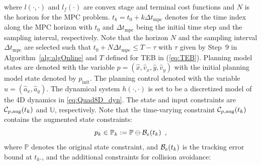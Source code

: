 %
where $l(\cdot,\cdot)$ and $l_f(\cdot)$ are convex stage and terminal cost functions and $N$ is the horizon for the MPC problem. 
$t_k = t_0 + k \Delta t_{\text{mpc}}$ denotes for the time index along the MPC horizon with $t_0$ and $\Delta t_{\text{mpc}}$ being the initial time step and the sampling interval, respectively. 
Note that the horizon $N$ and the sampling interval $\Delta t_{\text{mpc}}$ are selected such that $t_0 + N \Delta t_{\text{mpc}}\leq T - \tau$ with $\tau$ given by Step~9 in Algorithm~\ref{alg:algOnline} and $T$ defined for TEB in (\ref{eq:TEB}). 
Planning model states are denoted with the variable $p = (\hat x, \hat v_x, \hat y, \hat v_y)$ with the initial planning model state denoted by $p_{\text{init}}$.
The planning control denoted with the variable $u = (\hat a_x, \hat a_y)$.
The dynamical system $h(\cdot,\cdot)$ is set to be a discretized model of the 4D dynamics in \eqref{eq:Quad8D_dyn}. The state and input constraints are $\mathcal C_{p,\text{aug}}(t_k)$ and $\mathbb{U}$, respectively. Note that the time-varying constraint $\mathcal C_{p,\text{aug}}(t_k)$ contains the augmented state constraints:
%
\begin{equation}
p_k \in \mathbb{P}_k :=\mathbb{P}\ominus\mathcal B_e(t_k) \enspace ,
\end{equation}
%
where $\mathbb{P}$ denotes the original state constraint, and $\mathcal B_e(t_k)$ is the tracking error bound at $t_k$., and the additional constraints for collision avoidance:

